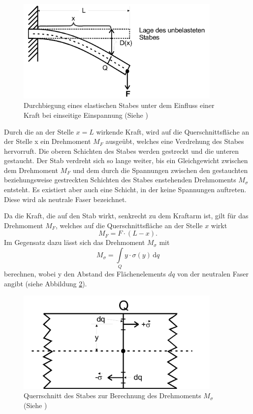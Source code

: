 \begin{figure}[h]
    \centering
    \includegraphics[width=10cm]{Theorie2.png}
    \caption{Durchbiegung eines elastischen Stabes unter dem Einfluss einer Kraft bei einseitige Einspannung (Siehe \cite{sample})}
    \label{fig:theorie2}
\end{figure}
\noindent
Durch die an der Stelle $x=L$ wirkende Kraft, wird auf
die Querschnittsfläche an der Stelle x ein 
Drehmoment $M_F$ ausgeübt, welches eine Verdrehung 
des Stabes hervorruft. Die oberen Schichten des 
Stabes werden gestreckt und die unteren gestaucht. 
Der Stab verdreht sich so lange weiter, bis ein 
Gleichgewicht zwischen dem Drehmoment $M_F$
und dem durch die Spannungen zwischen den gestauchten
beziehungsweise gestreckten Schichten des Stabes 
enstehenden Drehmoments $M_{\sigma}$ entsteht.
Es existiert aber auch eine Schicht, in der keine 
Spannungen auftreten. Diese wird als neutrale
Faser bezeichnet.

Da die Kraft, die auf den Stab wirkt, senkrecht 
zu dem Kraftarm ist, gilt für das Drehmoment 
$M_F$, welches auf die Querschnittsfläche an der
Stelle $x$ wirkt
\begin{equation}
    M_F = F \cdot (L-x).
    \label{eq:2}
\end{equation}
\noindent
Im Gegensatz dazu lässt sich das Drehmoment 
$M_{\sigma}$ mit 
\begin{equation}
    M_{\sigma} = \int\limits_Q \! y \cdot \sigma (y) \, \mathrm{d}q
    \label{eq:3}
\end{equation}
\noindent berechnen, wobei y den Abstand des 
Flächenelements $dq$ von der neutralen Faser
angibt (siehe Abbildung \ref{fig:theorie3}). 


\begin{figure}[h]
    \centering
    \includegraphics[width=10cm]{Theorie3.png}
    \caption{Querrschnitt des Stabes zur Berechnung des Drehmoments $M_{\sigma}$ (Siehe \cite{sample})}
    \label{fig:theorie3}
\end{figure}
\noindent

